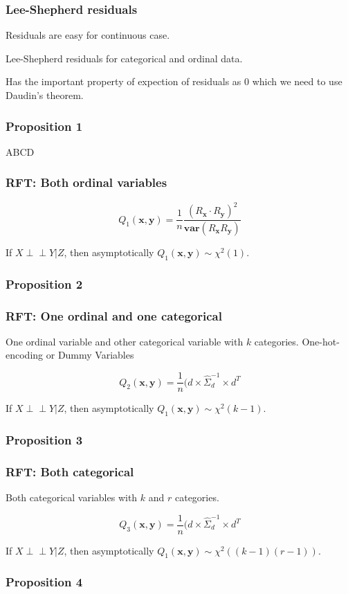 \documentclass{beamer}
\def\ci{\perp\!\!\!\!\!\perp}
\begin{document}
\begin{frame}
	\frametitle{Lee-Shepherd residuals}
	Residuals are easy for continuous case.

	Lee-Shepherd residuals for categorical and ordinal data.

	Has the important property of expection of residuals as $ 0 $ which 
	we need to use Daudin's theorem.
\end{frame}

\begin{frame}
	\frametitle{Proposition 1}
	ABCD
\end{frame}

\begin{frame}
	\frametitle{RFT: Both ordinal variables}
	$$ Q_1(\bm{x}, \bm{y}) = \frac{1}{n} \frac{(R_{\bm{x}} \cdot R_{\bm{y}})^2}{\bm{var}(R_{\bm{x}} R_{\bm{y}})} $$

	If $ X \ci Y | Z $, then asymptotically $ Q_1(\bm{x}, \bm{y}) \sim \chi^2(1) $.
\end{frame}

\begin{frame}
	\frametitle{Proposition 2}
\end{frame}

\begin{frame}
	\frametitle{RFT: One ordinal and one categorical}
	One ordinal variable and other categorical variable with $ k $ categories.
	One-hot-encoding or Dummy Variables


	$$ Q_2(\bm{x}, \bm{y}) = \frac{1}{n} (d \times \hat{\Sigma}_d^{-1} \times d^T $$

	If $ X \ci Y | Z $, then asymptotically $ Q_1(\bm{x}, \bm{y}) \sim \chi^2(k-1) $.
\end{frame}

\begin{frame}
	\frametitle{Proposition 3}
\end{frame}

\begin{frame}
	\frametitle{RFT: Both categorical}
	Both categorical variables with $ k $ and $ r $ categories.


	$$ Q_3(\bm{x}, \bm{y}) = \frac{1}{n} (d \times \hat{\Sigma}_d^{-1} \times d^T $$

	If $ X \ci Y | Z $, then asymptotically $ Q_1(\bm{x}, \bm{y}) \sim
	\chi^2((k-1)(r-1)) $.
\end{frame}

\begin{frame}
	\frametitle{Proposition 4}
\end{frame}
\end{document}
